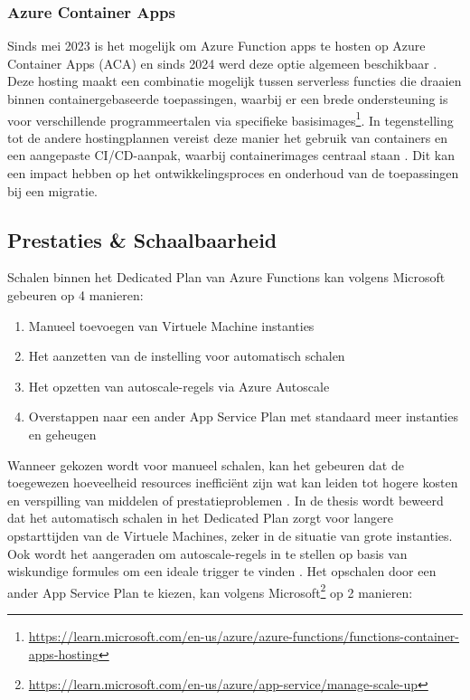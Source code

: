 \subsubsection{Azure Container Apps}

Sinds mei 2023 is het mogelijk om Azure Function apps te hosten op Azure Container Apps (ACA) en sinds 2024 werd deze optie algemeen beschikbaar \autocite{Techcommunity2024a}. Deze hosting maakt een combinatie mogelijk tussen serverless functies die draaien binnen containergebaseerde toepassingen, waarbij er een brede ondersteuning is voor verschillende programmeertalen via specifieke basisimages\footnote{\label{af:container-apps}\url{https://learn.microsoft.com/en-us/azure/azure-functions/functions-container-apps-hosting}}. In tegenstelling tot de andere hostingplannen vereist deze manier het gebruik van containers en een aangepaste CI/CD-aanpak, waarbij containerimages centraal staan \autocite{George2022c}. Dit kan een impact hebben op het ontwikkelingsproces en onderhoud van de toepassingen bij een migratie.

\subsection{Prestaties \& Schaalbaarheid}

Schalen binnen het Dedicated Plan van Azure Functions kan volgens Microsoft gebeuren op 4 manieren: 

\begin{enumerate}
    \item Manueel toevoegen van Virtuele Machine instanties
    \item Het aanzetten van de instelling voor automatisch schalen
    \item Het opzetten van autoscale-regels via Azure Autoscale
    \item Overstappen naar een ander App Service Plan met standaard meer instanties en geheugen
\end{enumerate}

Wanneer gekozen wordt voor manueel schalen, kan het gebeuren dat de toegewezen hoeveelheid resources inefficiënt zijn wat kan leiden tot hogere kosten en verspilling van middelen of prestatieproblemen \autocite{VishalHazarika2024}. In de thesis \textcite{Falck2024} wordt beweerd dat het automatisch schalen in het Dedicated Plan zorgt voor langere opstarttijden van de Virtuele Machines, zeker in de situatie van grote instanties. Ook wordt het aangeraden om autoscale-regels in te stellen op basis van wiskundige formules om een ideale trigger te vinden \autocite{Falck2024}. Het opschalen door een ander App Service Plan te kiezen, kan volgens Microsoft\footnote{\label{af:dedicated-plan-scale-up}\url{https://learn.microsoft.com/en-us/azure/app-service/manage-scale-up}} op 2 manieren: 

